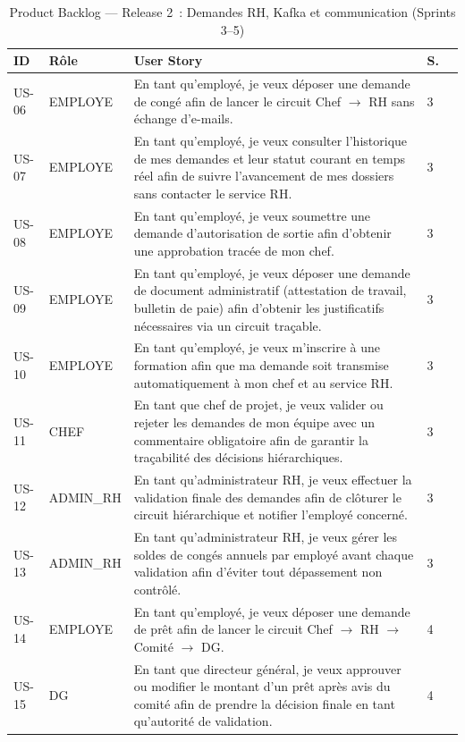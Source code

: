 \begin{table}[H]
\centering\small
\caption{Product Backlog — Release 2~: Demandes RH, Kafka et communication (Sprints 3--5)}
\label{tab:backlog_r2}
\begin{tabularx}{\textwidth}{Vp{0.9cm}|p{1.8cm}|L|p{0.6cm}|}
\hline
\textbf{ID} & \textbf{Rôle} & \textbf{User Story} & \textbf{S.} \\
\hline
US-06 & EMPLOYE & En tant qu’employé, je veux déposer une demande de congé afin de lancer le circuit Chef $\rightarrow$ RH sans échange d’e-mails. & 3 \\
\hline
US-07 & EMPLOYE & En tant qu’employé, je veux consulter l’historique de mes demandes et leur statut courant en temps réel afin de suivre l’avancement de mes dossiers sans contacter le service RH. & 3 \\
\hline
US-08 & EMPLOYE & En tant qu’employé, je veux soumettre une demande d’autorisation de sortie afin d’obtenir une approbation tracée de mon chef. & 3 \\
\hline
US-09 & EMPLOYE & En tant qu’employé, je veux déposer une demande de document administratif (attestation de travail, bulletin de paie) afin d’obtenir les justificatifs nécessaires via un circuit traçable. & 3 \\
\hline
US-10 & EMPLOYE & En tant qu’employé, je veux m’inscrire à une formation afin que ma demande soit transmise automatiquement à mon chef et au service RH. & 3 \\
\hline
US-11 & CHEF & En tant que chef de projet, je veux valider ou rejeter les demandes de mon équipe avec un commentaire obligatoire afin de garantir la traçabilité des décisions hiérarchiques. & 3 \\
\hline
US-12 & ADMIN\_RH & En tant qu’administrateur RH, je veux effectuer la validation finale des demandes afin de clôturer le circuit hiérarchique et notifier l’employé concerné. & 3 \\
\hline
US-13 & ADMIN\_RH & En tant qu’administrateur RH, je veux gérer les soldes de congés annuels par employé avant chaque validation afin d’éviter tout dépassement non contrôlé. & 3 \\
\hline
US-14 & EMPLOYE & En tant qu’employé, je veux déposer une demande de prêt afin de lancer le circuit Chef $\rightarrow$ RH $\rightarrow$ Comité $\rightarrow$ DG. & 4 \\
\hline
US-15 & DG & En tant que directeur général, je veux approuver ou modifier le montant d’un prêt après avis du comité afin de prendre la décision finale en tant qu’autorité de validation. & 4 \\

\end{tabularx}
\end{table}

